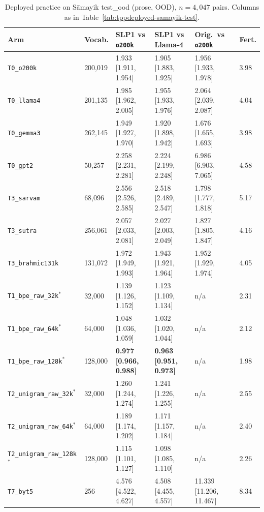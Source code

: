 \begin{table}[t]
\centering
\scriptsize
\begin{tabular}{llllll}
\toprule
Arm & Vocab. & SLP1 vs \texttt{o200k} & SLP1 vs Llama-4 & Orig.\ vs \texttt{o200k} & Fert. \\
\midrule
\texttt{T0\_o200k} & 200,019 & 1.933 [1.911, 1.954] & 1.905 [1.883, 1.925] & 1.956 [1.933, 1.978] & 3.98 \\
\texttt{T0\_llama4} & 201,135 & 1.985 [1.962, 2.005] & 1.955 [1.933, 1.976] & 2.064 [2.039, 2.087] & 4.04 \\
\texttt{T0\_gemma3} & 262,145 & 1.949 [1.927, 1.970] & 1.920 [1.898, 1.942] & 1.676 [1.655, 1.693] & 3.98 \\
\texttt{T0\_gpt2} & 50,257 & 2.258 [2.231, 2.281] & 2.224 [2.199, 2.248] & 6.986 [6.903, 7.065] & 4.58 \\
\texttt{T3\_sarvam} & 68,096 & 2.556 [2.526, 2.585] & 2.518 [2.489, 2.547] & 1.798 [1.777, 1.818] & 5.17 \\
\texttt{T3\_sutra} & 256,061 & 2.057 [2.033, 2.081] & 2.027 [2.003, 2.049] & 1.827 [1.805, 1.847] & 4.16 \\
\texttt{T3\_brahmic131k} & 131,072 & 1.972 [1.949, 1.993] & 1.943 [1.921, 1.964] & 1.952 [1.929, 1.974] & 4.05 \\
\texttt{T1\_bpe\_raw\_32k}$^{*}$ & 32,000 & 1.139 [1.126, 1.152] & 1.123 [1.109, 1.134] & n/a & 2.31 \\
\texttt{T1\_bpe\_raw\_64k}$^{*}$ & 64,000 & 1.048 [1.036, 1.059] & 1.032 [1.020, 1.044] & n/a & 2.12 \\
\texttt{T1\_bpe\_raw\_128k}$^{*}$ & 128,000 & \textbf{0.977 [0.966, 0.988]} & \textbf{0.963 [0.951, 0.973]} & n/a & 1.98 \\
\texttt{T2\_unigram\_raw\_32k}$^{*}$ & 32,000 & 1.260 [1.244, 1.274] & 1.241 [1.226, 1.255] & n/a & 2.55 \\
\texttt{T2\_unigram\_raw\_64k}$^{*}$ & 64,000 & 1.189 [1.174, 1.202] & 1.171 [1.157, 1.184] & n/a & 2.40 \\
\texttt{T2\_unigram\_raw\_128k}$^{*}$ & 128,000 & 1.115 [1.101, 1.127] & 1.098 [1.085, 1.110] & n/a & 2.26 \\
\texttt{T7\_byt5} & 256 & 4.576 [4.522, 4.627] & 4.508 [4.455, 4.557] & 11.339 [11.206, 11.467] & 8.34 \\
\bottomrule
\end{tabular}
\caption{Deployed practice on S\=amayik test\_ood (prose, OOD), $n=4{,}047$ pairs. Columns as in Table~\ref{tab:tppdeployed-samayik-test}.}
\label{tab:tppdeployed-samayik-test-ood}
\end{table}

